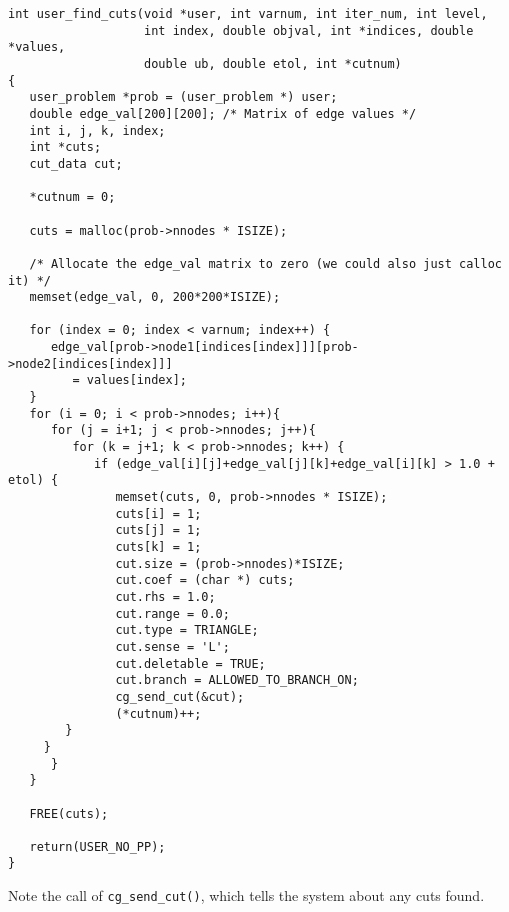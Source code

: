 \documentclass[11pt]{article}
\begin{document}
\begin{verbatim}
int user_find_cuts(void *user, int varnum, int iter_num, int level,
                   int index, double objval, int *indices, double *values,
                   double ub, double etol, int *cutnum)
{
   user_problem *prob = (user_problem *) user;
   double edge_val[200][200]; /* Matrix of edge values */
   int i, j, k, index;
   int *cuts;
   cut_data cut;
   
   *cutnum = 0;

   cuts = malloc(prob->nnodes * ISIZE);

   /* Allocate the edge_val matrix to zero (we could also just calloc it) */
   memset(edge_val, 0, 200*200*ISIZE);
   
   for (index = 0; index < varnum; index++) {
      edge_val[prob->node1[indices[index]]][prob->node2[indices[index]]] 
         = values[index];
   }
   for (i = 0; i < prob->nnodes; i++){
      for (j = i+1; j < prob->nnodes; j++){
         for (k = j+1; k < prob->nnodes; k++) {
            if (edge_val[i][j]+edge_val[j][k]+edge_val[i][k] > 1.0 + etol) {
               memset(cuts, 0, prob->nnodes * ISIZE);
               cuts[i] = 1; 
               cuts[j] = 1;
               cuts[k] = 1;
               cut.size = (prob->nnodes)*ISIZE;
               cut.coef = (char *) cuts;
               cut.rhs = 1.0;
               cut.range = 0.0;
               cut.type = TRIANGLE;
               cut.sense = 'L';
               cut.deletable = TRUE;
               cut.branch = ALLOWED_TO_BRANCH_ON;
               cg_send_cut(&cut);
               (*cutnum)++;
	    }
	 }
      }
   }
   
   FREE(cuts);

   return(USER_NO_PP);
}
\end{verbatim}

Note the call of \texttt{cg\_send\_cut()}, which tells the system about any
cuts found.
\end{document}
